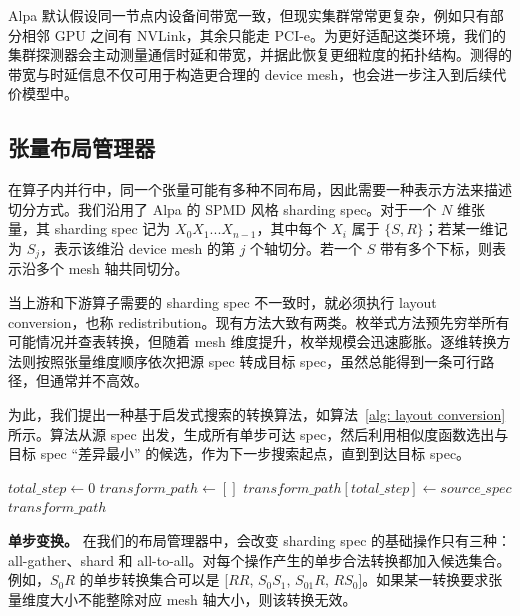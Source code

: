 \documentclass[10pt,letterpaper,twocolumn]{article}
\begin{document}
Alpa 默认假设同一节点内设备间带宽一致，但现实集群常常更复杂，例如只有部分相邻 GPU 之间有 NVLink，其余只能走 PCI-e。为更好适配这类环境，我们的集群探测器会主动测量通信时延和带宽，并据此恢复更细粒度的拓扑结构。测得的带宽与时延信息不仅可用于构造更合理的 device mesh，也会进一步注入到后续代价模型中。

\subsection{张量布局管理器}

在算子内并行中，同一个张量可能有多种不同布局，因此需要一种表示方法来描述切分方式。我们沿用了 Alpa 的 SPMD 风格 sharding spec。对于一个 $N$ 维张量，其 sharding spec 记为 $X_0X_1...X_{n-1}$，其中每个 $X_i$ 属于 $\{S, R\}$；若某一维记为 $S_j$，表示该维沿 device mesh 的第 $j$ 个轴切分。若一个 $S$ 带有多个下标，则表示沿多个 mesh 轴共同切分。

当上游和下游算子需要的 sharding spec 不一致时，就必须执行 layout conversion，也称 redistribution。现有方法大致有两类。枚举式方法预先穷举所有可能情况并查表转换，但随着 mesh 维度提升，枚举规模会迅速膨胀。逐维转换方法则按照张量维度顺序依次把源 spec 转成目标 spec，虽然总能得到一条可行路径，但通常并不高效。

为此，我们提出一种基于启发式搜索的转换算法，如算法~\ref{alg: layout conversion} 所示。算法从源 spec 出发，生成所有单步可达 spec，然后利用相似度函数选出与目标 spec ``差异最小'' 的候选，作为下一步搜索起点，直到到达目标 spec。

\begin{algorithm}[h]
\caption{张量布局转换路径搜索}
\label{alg: layout conversion}
$total\_step \leftarrow 0$\;
$transform\_path \leftarrow []$\;
$transform\_path[total\_step] \leftarrow source\_spec$\;
\Return $transform\_path$\;
\end{algorithm}

\noindent\textbf{单步变换。} 在我们的布局管理器中，会改变 sharding spec 的基础操作只有三种：all-gather、shard 和 all-to-all。对每个操作产生的单步合法转换都加入候选集合。例如，$S_0R$ 的单步转换集合可以是 [$RR$, $S_0S_1$, $S_{01}R$, $RS_0$]。如果某一转换要求张量维度大小不能整除对应 mesh 轴大小，则该转换无效。
\end{document}
